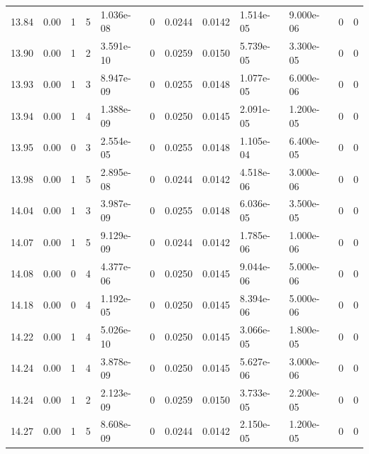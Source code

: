 \documentclass[preview]{standalone}
\begin{document}
{{{{{{{{{\begin{tabular}{L{1.2cm}C{1.2cm} C{0.3cm}C{0.5cm} C{1.4cm}C{1.4cm} C{1.4cm}C{1.4cm} C{1.6cm}C{1.6cm} C{1.6cm}C{1.6cm}}
  13.84  &  0.00  & 1     &  5 &  1.036e-08  & 0  &  0.0244&   0.0142& 1.514e-05 & 9.000e-06   &  0 & 0  \\ 
  13.90  &  0.00  & 1     &  2 &  3.591e-10  & 0  &  0.0259&   0.0150& 5.739e-05 & 3.300e-05   &  0 & 0  \\ 
  13.93  &  0.00  & 1     &  3 &  8.947e-09  & 0  &  0.0255&   0.0148& 1.077e-05 & 6.000e-06   &  0 & 0  \\ 
  13.94  &  0.00  & 1     &  4 &  1.388e-09  & 0  &  0.0250&   0.0145& 2.091e-05 & 1.200e-05   &  0 & 0  \\ 
  13.95  &  0.00  & 0     &  3 &  2.554e-05  & 0  &  0.0255&   0.0148& 1.105e-04 & 6.400e-05   &  0 & 0  \\ 
  13.98  &  0.00  & 1     &  5 &  2.895e-08  & 0  &  0.0244&   0.0142& 4.518e-06 & 3.000e-06   &  0 & 0  \\ 
  14.04  &  0.00  & 1     &  3 &  3.987e-09  & 0  &  0.0255&   0.0148& 6.036e-05 & 3.500e-05   &  0 & 0  \\ 
  14.07  &  0.00  & 1     &  5 &  9.129e-09  & 0  &  0.0244&   0.0142& 1.785e-06 & 1.000e-06   &  0 & 0  \\ 
  14.08  &  0.00  & 0     &  4 &  4.377e-06  & 0  &  0.0250&   0.0145& 9.044e-06 & 5.000e-06   &  0 & 0  \\ 
  14.18  &  0.00  & 0     &  4 &  1.192e-05  & 0  &  0.0250&   0.0145& 8.394e-06 & 5.000e-06   &  0 & 0  \\ 
  14.22  &  0.00  & 1     &  4 &  5.026e-10  & 0  &  0.0250&   0.0145& 3.066e-05 & 1.800e-05   &  0 & 0  \\ 
  14.24  &  0.00  & 1     &  4 &  3.878e-09  & 0  &  0.0250&   0.0145& 5.627e-06 & 3.000e-06   &  0 & 0  \\ 
  14.24  &  0.00  & 1     &  2 &  2.123e-09  & 0  &  0.0259&   0.0150& 3.733e-05 & 2.200e-05   &  0 & 0  \\ 
  14.27  &  0.00  & 1     &  5 &  8.608e-09  & 0  &  0.0244&   0.0142& 2.150e-05 & 1.200e-05   &  0 & 0  \\ 
\hline 
\end{tabular} 

}}}}}}}}}
\end{document}

